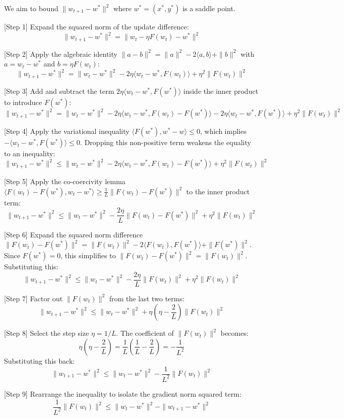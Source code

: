 \documentclass{article}
\begin{document}
We aim to bound $\|w_{t+1} - w^*\|^2$ where $w^* = (x^*, y^*)$ is a saddle point.

[Step 1] Expand the squared norm of the update difference:
$$ \|w_{t+1} - w^*\|^2 = \|w_t - \eta F(w_t) - w^*\|^2 $$

[Step 2] Apply the algebraic identity $\|a - b\|^2 = \|a\|^2 - 2\langle a, b \rangle + \|b\|^2$ with $a = w_t - w^*$ and $b = \eta F(w_t)$:
$$ \|w_{t+1} - w^*\|^2 = \|w_t - w^*\|^2 - 2\eta \langle w_t - w^*, F(w_t) \rangle + \eta^2 \|F(w_t)\|^2 $$

[Step 3] Add and subtract the term $2\eta \langle w_t - w^*, F(w^*) \rangle$ inside the inner product to introduce $F(w^*)$:
$$ \|w_{t+1} - w^*\|^2 = \|w_t - w^*\|^2 - 2\eta \langle w_t - w^*, F(w_t) - F(w^*) \rangle - 2\eta \langle w_t - w^*, F(w^*) \rangle + \eta^2 \|F(w_t)\|^2 $$

[Step 4] Apply the variational inequality $\langle F(w^*), w^* - w \rangle \leq 0$, which implies $-\langle w_t - w^*, F(w^*) \rangle \leq 0$. Dropping this non-positive term weakens the equality to an inequality:
$$ \|w_{t+1} - w^*\|^2 \leq \|w_t - w^*\|^2 - 2\eta \langle w_t - w^*, F(w_t) - F(w^*) \rangle + \eta^2 \|F(w_t)\|^2 $$

[Step 5] Apply the co-coercivity lemma $\langle F(w_t) - F(w^*), w_t - w^* \rangle \geq \frac{1}{L} \|F(w_t) - F(w^*)\|^2$ to the inner product term:
$$ \|w_{t+1} - w^*\|^2 \leq \|w_t - w^*\|^2 - \frac{2\eta}{L} \|F(w_t) - F(w^*)\|^2 + \eta^2 \|F(w_t)\|^2 $$

[Step 6] Expand the squared norm difference $\|F(w_t) - F(w^*)\|^2 = \|F(w_t)\|^2 - 2\langle F(w_t), F(w^*) \rangle + \|F(w^*)\|^2$. Since $F(w^*) = 0$, this simplifies to $\|F(w_t) - F(w^*)\|^2 = \|F(w_t)\|^2$. Substituting this:
$$ \|w_{t+1} - w^*\|^2 \leq \|w_t - w^*\|^2 - \frac{2\eta}{L} \|F(w_t)\|^2 + \eta^2 \|F(w_t)\|^2 $$

[Step 7] Factor out $\|F(w_t)\|^2$ from the last two terms:
$$ \|w_{t+1} - w^*\|^2 \leq \|w_t - w^*\|^2 + \eta \left( \eta - \frac{2}{L} \right) \|F(w_t)\|^2 $$

[Step 8] Select the step size $\eta = 1/L$. The coefficient of $\|F(w_t)\|^2$ becomes:
$$ \eta \left( \eta - \frac{2}{L} \right) = \frac{1}{L} \left( \frac{1}{L} - \frac{2}{L} \right) = -\frac{1}{L^2} $$
Substituting this back:
$$ \|w_{t+1} - w^*\|^2 \leq \|w_t - w^*\|^2 - \frac{1}{L^2} \|F(w_t)\|^2 $$

[Step 9] Rearrange the inequality to isolate the gradient norm squared term:
$$ \frac{1}{L^2} \|F(w_t)\|^2 \leq \|w_t - w^*\|^2 - \|w_{t+1} - w^*\|^2 $$
\end{document}
